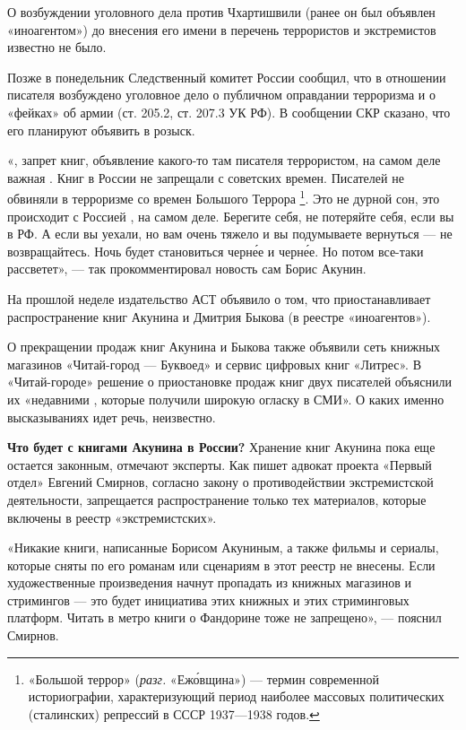 О возбуждении уголовного дела против Чхартишвили (ранее он был объявлен «иноагентом») до внесения его имени в перечень террористов и экстремистов известно не было.

Позже в понедельник Следственный комитет России сообщил, что в отношении писателя возбуждено уголовное дело о публичном оправдании терроризма и о «фейках» об армии (ст. 205.2, ст. 207.3 УК РФ). В сообщении СКР сказано, что его планируют объявить в розыск.

«, запрет книг,
объявление какого-то там писателя террористом, на самом деле важная
.
Книг в России не запрещали с советских времен.
Писателей не обвиняли в терроризме со времен Большого Террора%
\footnote{«Большой террор» (\textit{разг.} «Еж\'{о}вщина»)
--- термин современной историографии, характеризующий период
наиболее массовых политических (сталинских) репрессий
в СССР 1937—1938 годов.}.
Это не дурной сон, это происходит с Россией
, на самом деле.
Берегите себя, не потеряйте себя, если вы в РФ.
А если вы уехали, но вам очень тяжело
 и вы подумываете вернуться
--- не возвращайтесь.
Ночь будет становиться черн\'{е}е и черн\'{е}е.
Но потом все-таки рассветет», ---
так прокомментировал новость сам Борис Акунин.

На прошлой неделе издательство АСТ объявило о том,
что приостанавливает распространение книг
Акунина и Дмитрия Быкова (в реестре «иноагентов»).

О прекращении продаж книг Акунина и Быкова
также объявили сеть книжных магазинов «Читай-город — Буквоед»
и сервис цифровых книг «Литрес». В «Читай-городе» решение
о приостановке продаж книг двух писателей объяснили их
«недавними ,
которые получили широкую огласку в СМИ».
О каких именно высказываниях идет речь, неизвестно.

\textbf{Что будет с книгами Акунина в России?}
Хранение книг Акунина пока еще остается законным,
отмечают эксперты.
Как пишет адвокат проекта «Первый отдел» Евгений Смирнов,
согласно закону о противодействии экстремистской деятельности,
запрещается распространение только тех материалов,
которые включены в реестр «экстремистских».

«Никакие книги, написанные Борисом Акуниным, а также фильмы и сериалы,
которые сняты по его романам или сценариям в этот реестр не внесены.
Если художественные произведения начнут пропадать из книжных магазинов
и стримингов --- это будет инициатива этих книжных и этих
стриминговых платформ.
Читать в метро книги о Фандорине тоже не запрещено», --- пояснил Смирнов.

